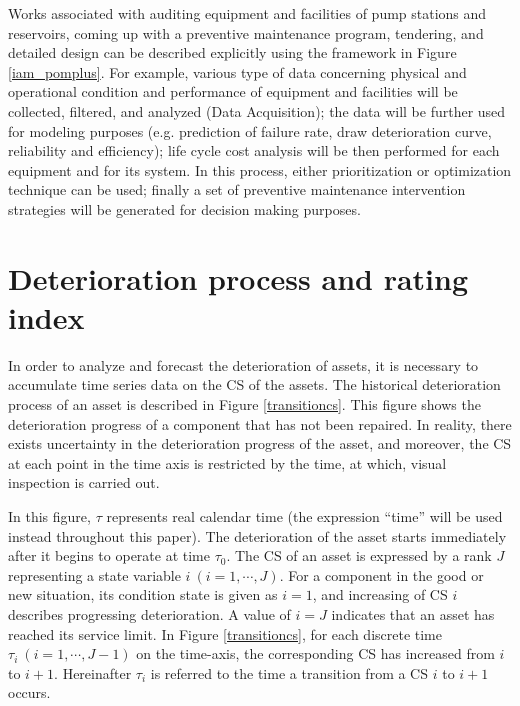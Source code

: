 Works associated with auditing equipment and facilities of pump stations and reservoirs, coming up with a preventive maintenance program, tendering, and detailed design can be described explicitly using the framework in Figure \ref{iam_pomplus}. For example, various type of data concerning physical and operational condition and performance of equipment and facilities will be collected, filtered, and analyzed (Data Acquisition); the data will be further used for modeling purposes (e.g. prediction of failure rate, draw deterioration curve, reliability and efficiency); life cycle cost analysis will be then performed for each equipment and for its system. In this process, either prioritization or optimization technique can be used; finally a set of preventive maintenance intervention strategies will be generated for decision making purposes.

\section{Deterioration process and rating index}
In order to analyze and forecast the deterioration of assets, it is necessary to accumulate time series data on the CS of the assets. The historical deterioration process of an asset is described in Figure \ref{transitioncs}. This figure shows the deterioration progress of a component that has not been repaired. In reality, there exists uncertainty in the deterioration progress of the asset, and moreover, the CS at each point in the time axis is restricted by the time, at which, visual inspection is carried out. 

In this figure, $\tau$ represents real calendar time (the expression ``time'' will be used instead throughout this paper). The deterioration of the asset starts immediately after it begins to operate at time $\tau_0$. The CS of an asset is expressed by a rank $J$ representing a state variable $i~(i=1,\cdots,J)$. For a component in the good or new situation, its condition state is given as $i=1$, and increasing of CS $i$ describes progressing deterioration. A value of $i=J$ indicates that an asset has reached its service limit. In Figure \ref{transitioncs}, for each discrete time $\tau_i~(i=1,\cdots,J-1)$ on the time-axis, the corresponding CS has increased from $i$ to $i+1$. Hereinafter $\tau_i$ is referred to the time a transition from a CS $i$ to $i+1$ occurs.

